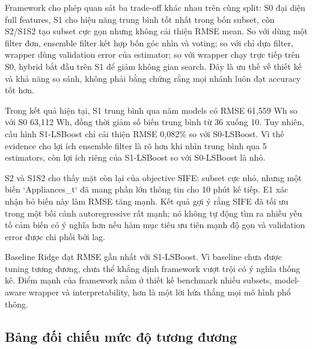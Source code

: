 Framework cho phép quan sát ba trade-off khác nhau trên cùng split: S0 đại diện full features, S1 cho hiệu năng trung bình tốt nhất trong bốn subset, còn S2/S1S2 tạo subset cực gọn nhưng không cải thiện RMSE mean. So với dùng một filter đơn, ensemble filter kết hợp bốn góc nhìn và voting; so với chỉ dựa filter, wrapper dùng validation error của estimator; so với wrapper chạy trực tiếp trên S0, hybrid bắt đầu trên S1 để giảm không gian search. Đây là ưu thế về thiết kế và khả năng so sánh, không phải bằng chứng rằng mọi nhánh luôn đạt accuracy tốt hơn.

Trong kết quả hiện tại, S1 trung bình qua năm models có RMSE 61,559 Wh so với S0 63,112 Wh, đồng thời giảm số biến trung bình từ 36 xuống 10. Tuy nhiên, cấu hình S1-LSBoost chỉ cải thiện RMSE 0,082\% so với S0-LSBoost. Vì thế evidence cho lợi ích ensemble filter là rõ hơn khi nhìn trung bình qua 5 estimators, còn lợi ích riêng của S1-LSBoost so với S0-LSBoost là nhỏ.

S2 và S1S2 cho thấy mặt còn lại của objective SIFE: subset cực nhỏ, nhưng một biến `Appliances\_t` đã mang phần lớn thông tin cho 10 phút kế tiếp. E1 xác nhận bỏ biến này làm RMSE tăng mạnh. Kết quả gợi ý rằng SIFE đã tối ưu trong một bối cảnh autoregressive rất mạnh; nó không tự động tìm ra nhiều yếu tố cảm biến có ý nghĩa hơn nếu hàm mục tiêu ưu tiên mạnh độ gọn và validation error được chi phối bởi lag.

Baseline Ridge đạt RMSE gần nhất với S1-LSBoost. Vì baseline chưa được tuning tương đương, chưa thể khẳng định framework vượt trội có ý nghĩa thống kê. Điểm mạnh của framework nằm ở thiết kế benchmark nhiều subsets, model-aware wrapper và interpretability, hơn là một lời hứa thắng mọi mô hình phổ thông.

\subsection{Bảng đối chiếu mức độ tương đương}\label{bux1ea3ng-ux111ux1ed1i-chiux1ebfu-mux1ee9c-ux111ux1ed9-tux1b0ux1a1ng-ux111ux1b0ux1a1ng}

